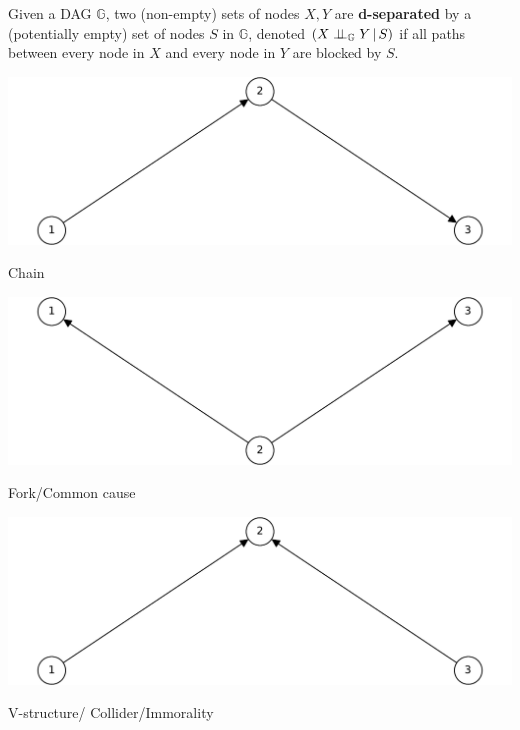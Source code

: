 \documentclass{tufte-book}
\begin{document}
\begin{definition}[d-separation]\label{def:dsep}

Given a DAG $\mathbb{G}$,  two (non-empty) sets of nodes $X,Y$ are \textbf{d-separated} by a (potentially empty) set of nodes $S$ in $\mathbb{G}$, denoted $(X\perp \!\!\! \perp_{\mathbb{G}}Y\,|\,S)$ if all paths between every node in $X$ and every node in $Y$ are blocked by $S$. 

\end{definition}

 \begin{marginfigure} \includegraphics[width=\linewidth]{ ./figures/chainl.pdf}\caption{ Chain} \end{marginfigure} 

 \begin{marginfigure} \includegraphics[width=\linewidth]{ ./figures/fork.pdf}\caption{ Fork/Common cause} \end{marginfigure} 
 \begin{marginfigure} \includegraphics[width=\linewidth]{ ./figures/collider.pdf}\caption{ V-structure/ Collider/Immorality} \end{marginfigure} 
\end{document}
